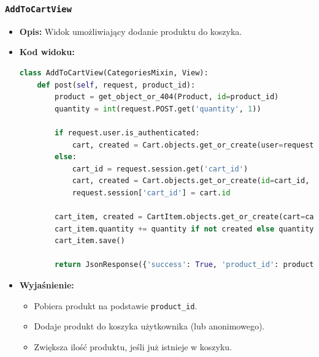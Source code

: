 \documentclass[12pt,a4paper,oneside]{article}
\theoremstyle{definition}
\numberwithin{equation}{section}
\begin{document}
\subsubsection*{\texttt{AddToCartView}}
\begin{itemize}
    \item \textbf{Opis:} Widok umożliwiający dodanie produktu do koszyka.
    \item \textbf{Kod widoku:}
\begin{lstlisting}[language=Python, caption=Kod widoku AddToCartView]
class AddToCartView(CategoriesMixin, View):
    def post(self, request, product_id):
        product = get_object_or_404(Product, id=product_id)
        quantity = int(request.POST.get('quantity', 1))

        if request.user.is_authenticated:
            cart, created = Cart.objects.get_or_create(user=request.user)
        else:
            cart_id = request.session.get('cart_id')
            cart, created = Cart.objects.get_or_create(id=cart_id, user=None) if cart_id else Cart.objects.create(user=None)
            request.session['cart_id'] = cart.id

        cart_item, created = CartItem.objects.get_or_create(cart=cart, product=product)
        cart_item.quantity += quantity if not created else quantity
        cart_item.save()

        return JsonResponse({'success': True, 'product_id': product_id, 'quantity': cart_item.quantity})
\end{lstlisting}

    \item \textbf{Wyjaśnienie:}
    \begin{itemize}
        \item Pobiera produkt na podstawie \texttt{product\_id}.
        \item Dodaje produkt do koszyka użytkownika (lub anonimowego).
        \item Zwiększa ilość produktu, jeśli już istnieje w koszyku.
    \end{itemize}
\end{itemize}
\end{document}
